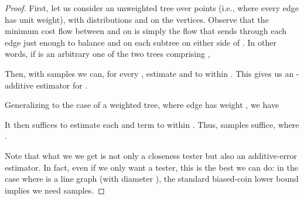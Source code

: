 \documentclass[11pt]{article}
\begin{document}
\begin{proof}
First, let us consider an unweighted tree  over  points (i.e., where
every edge has unit weight), with distributions  and  on the
vertices. Observe that the minimum cost flow between  and  on  is
simply the flow that sends through each edge  just enough to balance 
and  on each subtree on either side of . In other words, if  is
an arbitrary one of the two trees comprising ,

Then, with  samples we can, for every , estimate
 and  to within . This
gives us an -additive estimator for .

Generalizing to the case of a weighted tree, where edge  has weight
, we have

It then suffices to estimate each  and  term to within
. Thus,  samples
suffice, where .

Note that what we we get is
not only a closeness tester but also an additive-error estimator.
In fact, even if we only want a tester, this is the best we can do: in the case where  is a line graph (with diameter ), the standard biased-coin lower bound implies we need  samples.
\end{proof}
\end{document}
